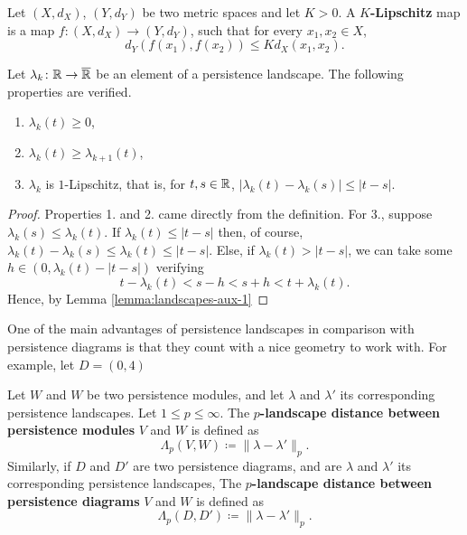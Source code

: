 \begin{definition}[$K$-Lipschitz]
    Let $ (X, d_X) $, $ (Y, d_Y) $ be two metric spaces and let $ K > 0 $. A {\bf $K$-Lipschitz} map is a map $ f \colon (X, d_X) \to (Y, d_Y) $, such that for every $ x_1, x_2 \in X $, 
    \begin{equation}
        d_Y(f(x_1), f(x_2)) \leq K d_X(x_1, x_2).
    \end{equation}
\end{definition}

\begin{lemma} \label{lemma:landscapes-aux-3}
    Let $ \lambda_k \colon \mathbb R \to \overline{\mathbb R} $ be an element of a persistence landscape. The following properties are verified.
    \begin{enumerate}
        \item $\lambda_k(t) \geq 0$,
        \item $\lambda_k(t) \geq \lambda_{k+1}(t)$,
        \item $\lambda_k$ is $1$-Lipschitz, that is, for $ t, s \in \mathbb R $, $ | \lambda_k(t) - \lambda_k(s) | \leq |t-s| $.
    \end{enumerate}
\end{lemma}
\begin{proof}
    Properties 1. and 2. came directly from the definition. For 3., suppose $ \lambda_k(s) \leq \lambda_k(t) $. If $ \lambda_k(t) \leq |t -s | $ then, of course, $ \lambda_k(t) - \lambda_k(s) \leq \lambda_k(t) \leq |t-s| $. Else, if $ \lambda_k(t) >  |t - s | $, we can take some $ h \in (0, \lambda_k(t) -  |t - s |) $ verifying
    \begin{equation}
        t - \lambda_k(t) < s- h < s + h < t + \lambda_k(t).
    \end{equation}
    Hence, by Lemma \ref{lemma:landscapes-aux-1}
\end{proof}

\begin{example}
    One of the main advantages of persistence landscapes in comparison with persistence diagrams is that they count with a nice geometry to work with.
    For example, let $ D = (0, 4) $
\end{example}

\begin{definition}
    Let $ W $ and $ W $ be two persistence modules, and let $ \lambda $ and $ \lambda' $ its corresponding persistence landscapes. Let $ 1 \leq p \leq \infty $. The {\bf $p$-landscape distance between persistence modules} $ V $ and $ W $ is defined as
    \begin{equation}
        \Lambda_p(V, W) \coloneq \|\lambda - \lambda' \|_p.
    \end{equation}
    Similarly, if $ D $ and $ D' $ are two persistence diagrams, and are $ \lambda $ and $ \lambda' $ its corresponding persistence landscapes, The {\bf $p$-landscape distance between persistence diagrams} $ V $ and $ W $ is defined as
    \begin{equation}
        \Lambda_p(D, D') \coloneq \|\lambda - \lambda' \|_p.
    \end{equation}
\end{definition}

